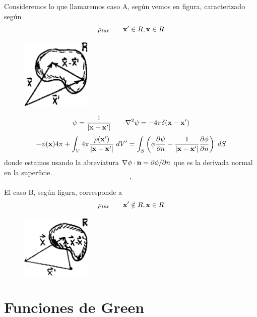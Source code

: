 \documentclass[10pt,oneside]{CBFT_book}
\begin{document}
Consideremos lo que llamaremos caso A, según vemos en figura, caracterizado según
\[
	\rho_{int} \qquad \vb{x}'\in R, \vb{x}\in R
\]
\begin{figure}[htb]
	\begin{center}
	\includegraphics[width=0.3\textwidth]{images/fig_ft1_imagegreen2.pdf}	 
	\end{center}
	\caption{}
\end{figure} 
\[
	\psi = \frac{1}{|\vb{x}-\vb{x}'|} \qquad \lapm{\psi} = -4\pi \delta(\vb{x}-\vb{x}')
\]
\[
	-\phi(\vb{x})4\pi + \int_V 4\pi \frac{\rho(\vb{x}')}{|\vb{x}-\vb{x}'|} \; dV' =
	\int_S \left( \phi\dpar{\psi}{n}-\frac{1}{|\vb{x}-\vb{x}'|}\dpar{\phi}{n}\right)\; dS 
\]
donde estamos usando la abreviatura $\Nabla\phi\cdot\vb{n}=\partial\phi/\partial n$ que es la
derivada normal en la superficie.
\[
	,
\]


El caso B, según figura, corresponde a
\[
	\rho_{int} \qquad \vb{x}'\notin R, \vb{x}\in R
\]


\begin{figure}[htb]
	\begin{center}
	\includegraphics[width=0.3\textwidth]{images/fig_ft1_imagegreen3.pdf}	 
	\end{center}
	\caption{}
\end{figure} 

\section{Funciones de Green}
\end{document}
